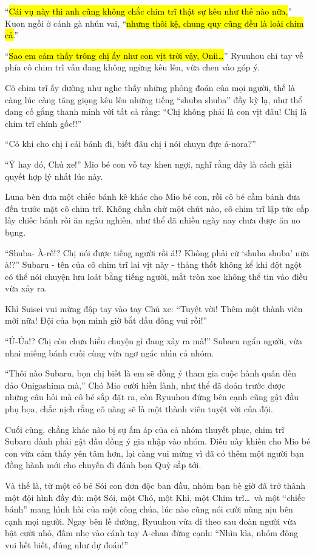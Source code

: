 \documentclass[../main.tex]{subfiles}
\begin{document}
``\hl{Cái vụ này thì anh cũng không chắc chim trĩ thật sự kêu như thế nào nữa,}'' Kuon ngồi ở cánh gà nhún vai, ``\hl{nhưng thôi kệ, chung quy cũng đều là loài chim cả.}''

``\hl{Sao em cảm thấy trông chị ấy như con vịt trời vậy, Onii\dots}'' Ryuuhou chỉ tay về phía cô chim trĩ vẫn đang không ngừng kêu lên, vừa chen vào góp ý.

Cô chim trĩ ấy dường như nghe thấy những phỏng đoán của mọi người, thế là càng lúc càng tăng giọng kêu lên những tiếng ``shuba shuba'' đầy kỳ lạ, như thể đang cố gắng thanh minh với tất cả rằng: ``Chị không phải là con vịt đâu! Chị là chim trĩ chính gốc!!''

``Có khi cho chị í cái bánh đi, biết đâu chị í nói chuỵn đực á-nora?''

``Ý hay đó, Chủ xe!'' Mio bé con vỗ tay khen ngợi, nghĩ rằng đây là cách giải quyết hợp lý nhất lúc này.

Luna bèn đưa một chiếc bánh kê khác cho Mio bé con, rồi cô bé cầm bánh đưa đến trước mặt cô chim trĩ. Không chần chừ một chút nào, cô chim trĩ lập tức cắp lấy chiếc bánh rồi ăn ngấu nghiến, như thể đã nhiều ngày nay chưa được ăn no bụng.

``Shuba- À-rế!? Chị nói được tiếng người rồi á!? Không phải cứ `shuba shuba' nữa à!?'' Subaru - tên của cô chim trĩ lai vịt này - thảng thốt không kể khi đột ngột có thể nói chuyện lưu loát bằng tiếng người, mắt tròn xoe không thể tin vào điều vừa xảy ra.

Khỉ Suisei vui mừng đập tay vào tay Chủ xe: ``Tuyệt vời! Thêm một thành viên mới nữa! Đội của bọn mình giờ bắt đầu đông vui rồi!''

``Ủ-Ủa!? Chị còn chưa hiểu chuyện gì đang xảy ra mà!'' Subaru ngẩn người, vừa nhai miếng bánh cuối cùng vừa ngơ ngác nhìn cả nhóm.

``Thôi nào Subaru, bọn chị biết là em sẽ đồng ý tham gia cuộc hành quân đến đảo Onigashima mà,'' Chó Mio cười hiền lành, như thể đã đoán trước được những câu hỏi mà cô bé sắp đặt ra, còn Ryuuhou đứng bên cạnh cũng gật đầu phụ họa, chắc nịch rằng cô nàng sẽ là một thành viên tuyệt vời của đội.

Cuối cùng, chẳng khác nào bị sự ấm áp của cả nhóm thuyết phục, chim trĩ Subaru đành phải gật đầu đồng ý gia nhập vào nhóm. Điều này khiến cho Mio bé con vừa cảm thấy yên tâm hơn, lại càng vui mừng vì đã có thêm một người bạn đồng hành mới cho chuyến đi đánh bọn Quỷ sắp tới.

\ct

Và thế là, từ một cô bé Sói con đơn độc ban đầu, nhóm bạn bè giờ đã trở thành một đội hình đầy đủ: một Sói, một Chó, một Khỉ, một Chim trĩ\dots\ và một ``chiếc bánh'' mang hình hài của một công chúa, lúc nào cũng nói cười nũng nịu bên cạnh mọi người. Ngay bên lề đường, Ryuuhou vừa đi theo sau đoàn người vừa bật cười nhỏ, đấm nhẹ vào cánh tay A-chan đứng cạnh: ``Nhìn kìa, nhóm đông vui hết biết, đúng như dự đoán!''
\end{document}
